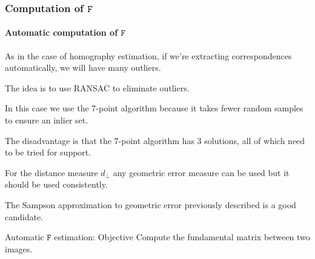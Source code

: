 \documentclass[aspectratio=169]{beamer}
\newcommand{\mat}[1]{\mathtt{#1}}
\begin{document}
\begin{frame}
\frametitle{Computation of $\mat{F}$}
\framesubtitle{Automatic computation of $\mat{F}$}

As in the case of homography estimation, if we're extracting
correspondences \alert{automatically}, we will have many
\alert{outliers}.

\medskip

The idea is to use RANSAC to eliminate outliers.

\medskip

In this case we use the \alert{7-point algorithm} because it takes
fewer random samples to ensure an inlier set.

\medskip

The disadvantage is that the 7-point algorithm has \alert{3
solutions}, \alert{all of which need to be tried} for support.

\medskip

For the distance measure $d_{\perp}$ any geometric error measure can
be used but it should be used consistently.

\medskip

The \alert{Sampson approximation} to geometric error previously
described is a good candidate.

\medskip

\begin{block}{Automatic $\mat{F}$ estimation: Objective}
Compute the fundamental matrix between two images.
\end{block}

\end{frame}
\end{document}
